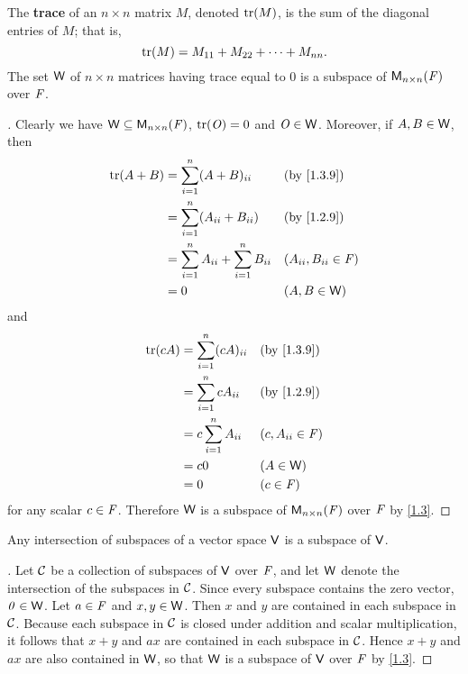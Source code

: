 \begin{eg}\label{1.3.9}
  The \textbf{trace} of an \(n \times n\) matrix \(M\), denoted \(\tr[M]\), is the sum of the diagonal entries of \(M\);
  that is,
  \[
    \tr[M] = M_{1 1} + M_{2 2} + \dots + M_{n n}.
  \]
  The set \(\mathsf{W}\) of \(n \times n\) matrices having trace equal to \(0\) is a subspace of \(\ms[n][n][\F]\) over \(\mathit{F}\).
\end{eg}

\begin{proof}[]
  Clearly we have \(\W \subseteq \ms[n][n][\F]\), \(\tr[\zm] = 0\) and \(\mathit{O} \in \mathsf{W}\).
  Moreover, if \(A, B \in \mathsf{W}\), then
  \begin{align*}
    \tr[A + B] & = \sum_{i = 1}^n (A + B)_{i i}                    &  & \by{1.3.9}                \\
               & = \sum_{i = 1}^n (A_{i i} + B_{i i})              &  & \by{1.2.9}                \\
               & = \sum_{i = 1}^n A_{i i} + \sum_{i = 1}^n B_{i i} &  & (A_{i i}, B_{i i} \in \F) \\
               & = 0                                               &  & (A, B \in \W)
  \end{align*}
  and
  \begin{align*}
    \tr[cA] & = \sum_{i = 1}^n (cA)_{i i} &  & \by{1.3.9}          \\
            & = \sum_{i = 1}^n cA_{i i}   &  & \by{1.2.9}          \\
            & = c \sum_{i = 1}^n A_{i i}  &  & (c, A_{i i} \in \F) \\
            & = c0                        &  & (A \in \W)          \\
            & = 0                         &  & (c \in \F)
  \end{align*}
  for any scalar \(c \in \mathit{F}\).
  Therefore \(\mathsf{W}\) is a subspace of \(\ms[n][n][\F]\) over \(\mathit{F}\) by \cref{1.3}.
\end{proof}

\begin{thm}\label{1.4}
  Any intersection of subspaces of a vector space \(\mathsf{V}\) is a subspace of \(\mathsf{V}\).
\end{thm}

\begin{proof}[]
  Let \(\mathcal{C}\) be a collection of subspaces of \(\mathsf{V}\) over \(\mathit{F}\), and let \(\mathsf{W}\) denote the intersection of the subspaces in \(\mathcal{C}\).
  Since every subspace contains the zero vector, \(\mathit{0} \in \mathsf{W}\).
  Let \(a \in \mathit{F}\) and \(x, y \in \mathsf{W}\).
  Then \(x\) and \(y\) are contained in each subspace in \(\mathcal{C}\).
  Because each subspace in \(\mathcal{C}\) is closed under addition and scalar multiplication, it follows that \(x + y\) and \(ax\) are contained in each subspace in \(\mathcal{C}\).
  Hence \(x + y\) and \(ax\) are also contained in \(\mathsf{W}\), so that \(\mathsf{W}\) is a subspace of \(\mathsf{V}\) over \(\mathit{F}\) by \cref{1.3}.
\end{proof}

